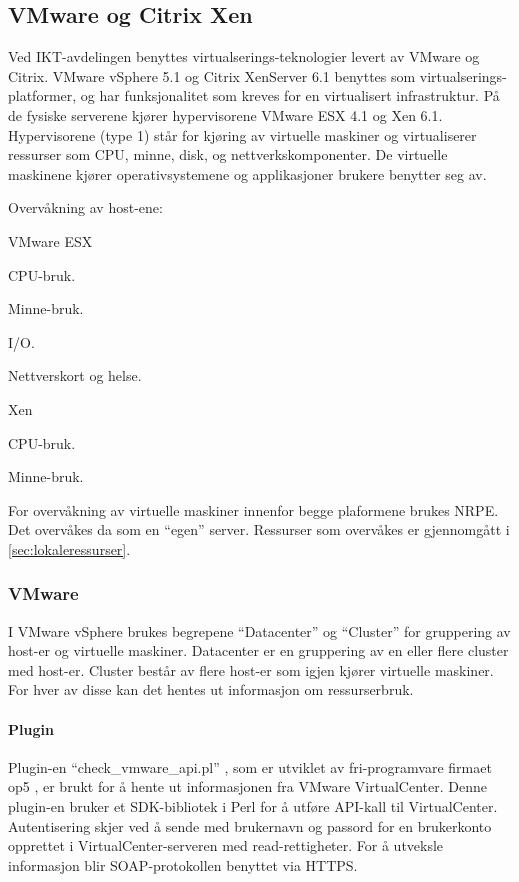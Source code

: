 \subsection{VMware og Citrix Xen}
Ved IKT-avdelingen benyttes virtualserings-teknologier levert av VMware og Citrix. VMware vSphere 5.1 og Citrix XenServer 6.1 benyttes som virtualserings-platformer, og har funksjonalitet som kreves for en virtualisert infrastruktur. På de fysiske serverene kjører hypervisorene VMware ESX 4.1 og Xen 6.1. Hypervisorene (type 1) står for kjøring av virtuelle maskiner og virtualiserer ressurser som CPU, minne, disk, og nettverkskomponenter. De virtuelle maskinene kjører operativsystemene og applikasjoner brukere benytter seg av.  

Overvåkning av host-ene:
\begin{itemize*}
\item VMware ESX
	\begin{itemize*}
	\item CPU-bruk.
	\item Minne-bruk.
	\item I/O.
	\item Nettverskort og helse.
	\end{itemize*}
\item Xen
	\begin{itemize*}
	\item CPU-bruk.
	\item Minne-bruk.
	\end{itemize*}
\end{itemize*}


For overvåkning av virtuelle maskiner innenfor begge plaformene brukes NRPE. Det overvåkes da som en ``egen'' server. Ressurser som overvåkes er gjennomgått i \ref{sec:lokaleressurser}.

\subsubsection{VMware}
I VMware vSphere brukes begrepene ``Datacenter'' og ``Cluster'' for gruppering av host-er og virtuelle maskiner.  Datacenter er en gruppering av en eller flere cluster med host-er. Cluster består av flere host-er som igjen kjører virtuelle maskiner. For hver av disse kan det hentes ut informasjon om ressurserbruk. 

\paragraph{Plugin}
Plugin-en ``check\_vmware\_api.pl'' , som er utviklet av fri-programvare firmaet op5 \cite{op5}, er brukt for å hente ut informasjonen fra VMware VirtualCenter. Denne plugin-en bruker et SDK-bibliotek i Perl \cite{vmwareperl} for å utføre API-kall til VirtualCenter. Autentisering skjer ved å sende med brukernavn og passord for en brukerkonto opprettet i VirtualCenter-serveren med read-rettigheter. For å utveksle informasjon blir SOAP-protokollen benyttet \cite{wiki:soap} via HTTPS.

